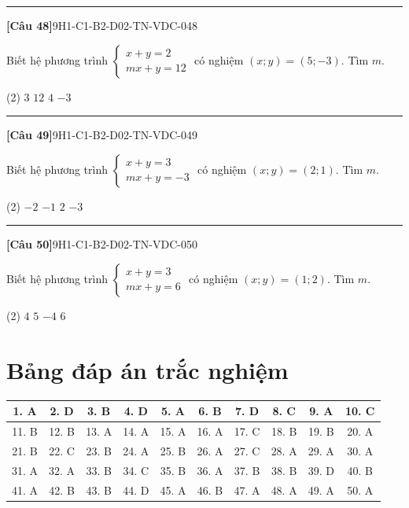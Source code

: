 \documentclass[12pt,a4paper]{article}
\newif\ifloigiai
\newenvironment{cauhoi}[2]{%
  \par\medskip\noindent\rule{\textwidth}{0.4pt}\par\nopagebreak
  \noindent\textbf{[#1]}\hfill{\scriptsize\ttfamily #2}\par\nopagebreak\smallskip}{\par}
\newcommand{\dapan}[1]{\ifloigiai\par\smallskip\noindent\textit{Đáp án:} \textbf{#1}\par\fi}
\begin{document}
\begin{cauhoi}{Câu 48}{9H1-C1-B2-D02-TN-VDC-048}
Biết hệ phương trình $\begin{cases}x+y=2\\ mx+y=12\end{cases}$ có nghiệm $(x;y)=(5;-3)$. Tìm $m$.
\begin{tasks}(2)
\task $3$
\task $12$
\task $4$
\task $-3$
\end{tasks}
\dapan{A}
\end{cauhoi}
\begin{cauhoi}{Câu 49}{9H1-C1-B2-D02-TN-VDC-049}
Biết hệ phương trình $\begin{cases}x+y=3\\ mx+y=-3\end{cases}$ có nghiệm $(x;y)=(2;1)$. Tìm $m$.
\begin{tasks}(2)
\task $-2$
\task $-1$
\task $2$
\task $-3$
\end{tasks}
\dapan{A}
\end{cauhoi}
\begin{cauhoi}{Câu 50}{9H1-C1-B2-D02-TN-VDC-050}
Biết hệ phương trình $\begin{cases}x+y=3\\ mx+y=6\end{cases}$ có nghiệm $(x;y)=(1;2)$. Tìm $m$.
\begin{tasks}(2)
\task $4$
\task $5$
\task $-4$
\task $6$
\end{tasks}
\dapan{A}
\end{cauhoi}
\clearpage\section*{Bảng đáp án trắc nghiệm}
\begin{center}\begin{tabular}{|c|c|c|c|c|c|c|c|c|c|}
\hline
1. A & 2. D & 3. B & 4. D & 5. A & 6. B & 7. D & 8. C & 9. A & 10. C\\\hline
11. B & 12. B & 13. A & 14. A & 15. A & 16. A & 17. C & 18. B & 19. B & 20. A\\\hline
21. B & 22. C & 23. B & 24. A & 25. B & 26. A & 27. C & 28. A & 29. A & 30. A\\\hline
31. A & 32. A & 33. B & 34. C & 35. B & 36. A & 37. B & 38. B & 39. D & 40. B\\\hline
41. A & 42. B & 43. B & 44. D & 45. A & 46. B & 47. A & 48. A & 49. A & 50. A\\\hline
\end{tabular}\end{center}
\end{document}
